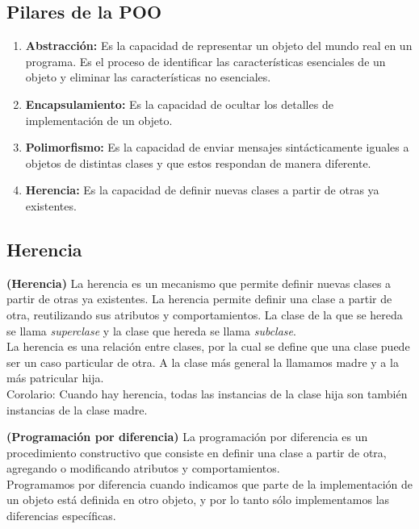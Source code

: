\documentclass[../main.tex]{subfiles}
\begin{document}
    \subsection{Pilares de la POO}          
        \begin{enumerate}
            \item \textbf{Abstracción:} Es la capacidad de representar un objeto del mundo real en un programa. Es el proceso de identificar las características esenciales de un objeto y eliminar las características no esenciales.
            \item \textbf{Encapsulamiento:} Es la capacidad de ocultar los detalles de implementación de un objeto.
            \item \textbf{Polimorfismo:} Es la capacidad de enviar mensajes sintácticamente iguales a objetos de distintas clases y que estos respondan de manera diferente.
            \item \textbf{Herencia:} Es la capacidad de definir nuevas clases a partir de otras ya existentes.
        \end{enumerate}
    
    \subsection{Herencia}   
        \begin{definition} \textbf{(Herencia)}
            La herencia es un mecanismo que permite definir nuevas clases a partir de otras ya existentes. La herencia permite definir una clase a partir de otra, reutilizando sus atributos y comportamientos. La clase de la que se hereda se llama \textit{superclase} y la clase que hereda se llama \textit{subclase}.\\

            La herencia es una relación entre clases, por la cual se define que una clase puede ser un caso particular de otra. A la clase más general la llamamos madre y a la más patricular hija.\\

            Corolario: Cuando hay herencia, todas las instancias de la clase hija son también instancias de la clase madre.
        \end{definition}

        \begin{definition} \textbf{(Programación por diferencia)}
            La programación por diferencia es un procedimiento constructivo que consiste en definir una clase a partir de otra, agregando o modificando atributos y comportamientos.\\

            Programamos por diferencia cuando indicamos que parte de la implementación de un objeto está definida en otro objeto, y por lo tanto sólo implementamos las diferencias específicas.
        \end{definition}
\end{document}
